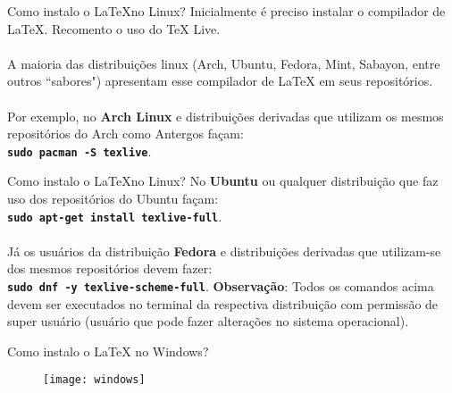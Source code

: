 \documentclass{beamer}
\begin{document}
\begin{frame}{Como instalo o \LaTeX no Linux?}
Inicialmente é preciso instalar o compilador de \LaTeX. Recomento o uso do \TeX \hspace{0.03cm} Live. \\~\\

A maioria das distribuições linux (Arch, Ubuntu, Fedora, Mint, Sabayon, entre outros ``sabores") apresentam esse compilador de \LaTeX \hspace{0.03cm} em seus repositórios.\\~\\

Por exemplo, no \textbf{Arch Linux} e distribuições derivadas que utilizam os mesmos repositórios do Arch como Antergos façam:\\
\vspace{0.5cm}
\hspace{3cm}\textbf{\texttt{sudo pacman -S texlive}}.
\end{frame}

\begin{frame}{Como instalo o \LaTeX no Linux?}
No \textbf{Ubuntu} ou qualquer distribuição que faz uso dos repositórios do Ubuntu façam:\\
\vspace{0.5cm}
\hspace{2cm} \textbf{\texttt{sudo apt-get install texlive-full}}.\\~\\

Já os usuários da distribuição \textbf{Fedora} e distribuições derivadas que utilizam-se dos mesmos repositórios devem fazer:\\
\vspace{0.5cm}
\hspace{2.5cm}\textbf{\texttt{sudo dnf -y texlive-scheme-full}}.\vspace{0.2cm}
\textbf{Observação}: Todos os comandos acima devem ser executados no terminal da respectiva distribuição com permissão de super usuário (usuário que pode fazer alterações no sistema operacional).
\end{frame}

\begin{frame}{Como instalo o \LaTeX \hspace{0.03cm} no Windows?}
	\begin{figure}[!htb]
		\centering
		\texttt{[image: windows]}\\
	\end{figure}
\end{frame}
\end{document}
